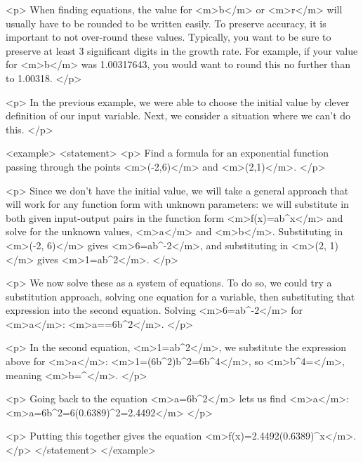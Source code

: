         <p>
            When finding equations, the value for <m>b</m> or <m>r</m> will usually have to be rounded to be written easily.
            To preserve accuracy, it is important to not over-round these values.
            Typically, you want to be sure to preserve at least 3 significant digits in the growth rate.
            For example, if your value for <m>b</m> was 1.00317643, you would want to round this no further than to 1.00318.
        </p>

        <p>
            In the previous example, we were able to choose the initial value by clever definition of our input variable.
            Next, we consider a situation where we can’t do this.
        </p>

        <example>
            <statement>
                <p>
                    Find a formula for an exponential function passing through the points <m>(-2,6)</m> and <m>(2,1)</m>.
                </p>

                <p>
                    Since we don’t have the initial value, we will take a general approach that will work for any function form with unknown parameters: we will substitute in both given input-output pairs in the function form <m>f(x)=ab^{x}</m> and solve for the unknown values, <m>a</m> and <m>b</m>.
                    Substituting in <m>(-2, 6)</m> gives <m>6=ab^{-2}</m>, and substituting in <m>(2, 1)</m> gives <m>1=ab^{2}</m>.
                </p>

                <p>
                    We now solve these as a system of equations.
                    To do so, we could try a substitution approach, solving one equation for a variable, then substituting that expression into the second equation.
                    Solving <m>6=ab^{-2}</m> for <m>a</m>: <m>a==6b^{2}</m>.
                </p>

                <p>
                    In the second equation, <m>1=ab^{2}</m>, we substitute the expression above for <m>a</m>: <m>1=(6b^{2})b^{2}=6b^{4}</m>, so <m>b^{4}=</m>, meaning <m>b=^{}</m>.
                </p>

                <p>
                    Going back to the equation <m>a=6b^{2}</m> lets us find <m>a</m>: <m>a=6b^{2}=6(0.6389)^{2}=2.4492</m>
                </p>

                <p>
                    Putting this together gives the equation <m>f(x)=2.4492(0.6389)^{x}</m>.
                </p>
            </statement>
        </example>


